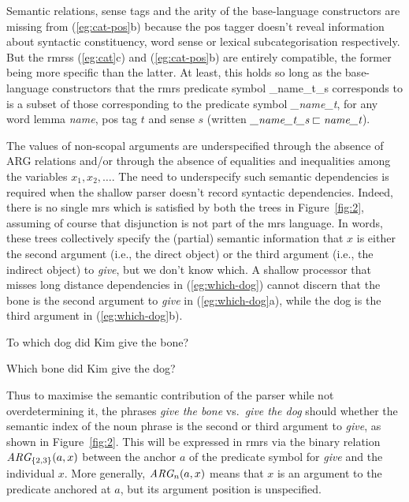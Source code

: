 Semantic relations, sense tags and the arity of the base-language
constructors are
missing from (\ref{eg:cat-pos}b) because the {\sc pos} tagger doesn't
reveal information about syntactic constituency, word sense or lexical
subcategorisation respectively.  
But the {\sc rmrs}s (\ref{eg:cat}c) and
(\ref{eg:cat-pos}b) are entirely compatible, the former being more
specific than the latter.  At least, this holds so long as the
base-language constructors that the {\sc rmrs} predicate symbol
{\_name\_t\_s} corresponds to is a 
subset of those corresponding to the predicate symbol {\em \_name\_t},
for any word lemma {\em name}, {\sc pos} tag $t$ and sense $s$ (written 
$\mbox{{\em \_name\_t\_s}} \sqsubset \mbox{{\em name\_t}}$). 

The values of non-scopal arguments are underspecified through the
absence of ARG relations and/or through the absence of
equalities and inequalities among the variables $x_1, x_2,\ldots$.
The need to
underspecify such semantic dependencies is required when
the shallow parser doesn't record syntactic dependencies.
Indeed, there is no single {\sc mrs} which is satisfied by both the
trees in Figure~\ref{fig:2}, assuming of course that disjunction is not part of
the {\sc mrs} language.  In words, these trees collectively specify
the (partial) semantic information that $x$ is either the second
argument (i.e., the direct object) or the third argument (i.e., the
indirect object) to {\em give}, but we don't know which.  
A shallow
processor that misses long distance dependencies in
(\ref{eg:which-dog}) cannot
discern that the bone is the second argument to {\em
  give} in (\ref{eg:which-dog}a), while the dog is the third argument
in (\ref{eg:which-dog}b).
\begin{examples}
\item   \label{eg:which-dog}
\begin{subexamples}
\item   To which dog did Kim give the bone?
\item   Which bone did Kim give the dog?
\end{subexamples}
\end{examples}
Thus to maximise the semantic contribution
of the parser while not overdetermining it, the phrases
{\em give the bone} vs.\
{\em give the dog} should whether the semantic index of the noun
phrase is the second or third argument to {\em give},
as shown in Figure~\ref{fig:2}.   This will be expressed in
{\sc rmrs} via the binary relation  $\mbox{{\em ARG}}_{\{2,3\}}(a,x)$
between the anchor $a$ of the predicate symbol for {\em give} and the
individual $x$.   More generally, $\mbox{{\em ARG}}_n(a,x)$ means that
$x$ is an argument to the predicate anchored at $a$, but its argument
position is unspecified.

